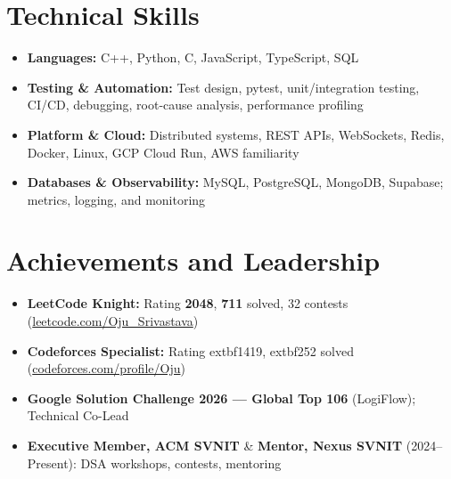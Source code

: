 \documentclass[a4paper,10pt]{article}
\newcommand{\resumeItemListStart}{\begin{itemize}[leftmargin=*, topsep=2pt, itemsep=1.5pt, parsep=0pt, partopsep=0pt]}
\newcommand{\resumeItemListEnd}{\end{itemize}\vspace{0.5mm}}
\begin{document}
\section{Technical Skills}
\small
\begin{itemize}[label={}, topsep=2pt, itemsep=1.5pt]
  \item \textbf{Languages:} C++, Python, C, JavaScript, TypeScript, SQL
  \item \textbf{Testing \& Automation:} Test design, pytest, unit/integration testing, CI/CD, debugging, root-cause analysis, performance profiling
  \item \textbf{Platform \& Cloud:} Distributed systems, REST APIs, WebSockets, Redis, Docker, Linux, GCP Cloud Run, AWS familiarity
  \item \textbf{Databases \& Observability:} MySQL, PostgreSQL, MongoDB, Supabase; metrics, logging, and monitoring
\end{itemize}

\section{Achievements and Leadership}
\small
\resumeItemListStart
  \item \textbf{LeetCode Knight:} Rating \textbf{2048}, \textbf{711} solved, 32 contests (\href{https://leetcode.com/Oju_Srivastava}{leetcode.com/Oju\_Srivastava})
  \item \textbf{Codeforces Specialist:} Rating 	extbf{1419}, 	extbf{252} solved (\href{https://codeforces.com/profile/Oju}{codeforces.com/profile/Oju})
  \item \textbf{Google Solution Challenge 2026 --- Global Top 106} (LogiFlow); Technical Co-Lead
  \item \textbf{Executive Member, ACM SVNIT} \& \textbf{Mentor, Nexus SVNIT} (2024--Present): DSA workshops, contests, mentoring
\resumeItemListEnd
\end{document}
